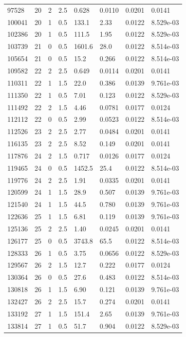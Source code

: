 \documentclass[preview]{standalone}
\begin{document}
{{{\begin{tabular}{L{1.2cm}C{1.2cm} C{0.3cm}C{0.5cm} C{1.4cm}C{1.4cm} C{1.4cm}C{1.4cm}}
  97528  &    20  & 2     & 2.5 &  0.628  & 0.0110  & 0.0201 &  0.0141   \\ 
  100041  &    20  & 1     & 0.5 &  133.1  & 2.33  & 0.0122 &  8.529e-03   \\ 
  102386  &    20  & 1     & 0.5 &  111.5  & 1.95  & 0.0122 &  8.529e-03   \\ 
  103739  &    21  & 0     & 0.5 &  1601.6  & 28.0  & 0.0122 &  8.514e-03   \\ 
  105654  &    21  & 0     & 0.5 &  15.2  & 0.266  & 0.0122 &  8.514e-03   \\ 
  109582  &    22  & 2     & 2.5 &  0.649  & 0.0114  & 0.0201 &  0.0141   \\ 
  110311  &    22  & 1     & 1.5 &  22.0  & 0.386  & 0.0139 &  9.761e-03   \\ 
  111350  &    22  & 1     & 0.5 &  7.01  & 0.123  & 0.0122 &  8.529e-03   \\ 
  111492  &    22  & 2     & 1.5 &  4.46  & 0.0781  & 0.0177 &  0.0124   \\ 
  112112  &    22  & 0     & 0.5 &  2.99  & 0.0523  & 0.0122 &  8.514e-03   \\ 
  112526  &    23  & 2     & 2.5 &  2.77  & 0.0484  & 0.0201 &  0.0141   \\ 
  116135  &    23  & 2     & 2.5 &  8.52  & 0.149  & 0.0201 &  0.0141   \\ 
  117876  &    24  & 2     & 1.5 &  0.717  & 0.0126  & 0.0177 &  0.0124   \\ 
  119465  &    24  & 0     & 0.5 &  1452.5  & 25.4  & 0.0122 &  8.514e-03   \\ 
  119776  &    24  & 2     & 2.5 &  1.91  & 0.0335  & 0.0201 &  0.0141   \\ 
  120599  &    24  & 1     & 1.5 &  28.9  & 0.507  & 0.0139 &  9.761e-03   \\ 
  121540  &    24  & 1     & 1.5 &  44.5  & 0.780  & 0.0139 &  9.761e-03   \\ 
  122636  &    25  & 1     & 1.5 &  6.81  & 0.119  & 0.0139 &  9.761e-03   \\ 
  125136  &    25  & 2     & 2.5 &  1.40  & 0.0245  & 0.0201 &  0.0141   \\ 
  126177  &    25  & 0     & 0.5 &  3743.8  & 65.5  & 0.0122 &  8.514e-03   \\ 
  128333  &    26  & 1     & 0.5 &  3.75  & 0.0656  & 0.0122 &  8.529e-03   \\ 
  129567  &    26  & 2     & 1.5 &  12.7  & 0.222  & 0.0177 &  0.0124   \\ 
  130364  &    26  & 0     & 0.5 &  27.6  & 0.483  & 0.0122 &  8.514e-03   \\ 
  130818  &    26  & 1     & 1.5 &  6.90  & 0.121  & 0.0139 &  9.761e-03   \\ 
  132427  &    26  & 2     & 2.5 &  15.7  & 0.274  & 0.0201 &  0.0141   \\ 
  133192  &    27  & 1     & 1.5 &  151.4  & 2.65  & 0.0139 &  9.761e-03   \\ 
  133814  &    27  & 1     & 0.5 &  51.7  & 0.904  & 0.0122 &  8.529e-03   \\ 
\hline 
\end{tabular} 

}}}
\end{document}
